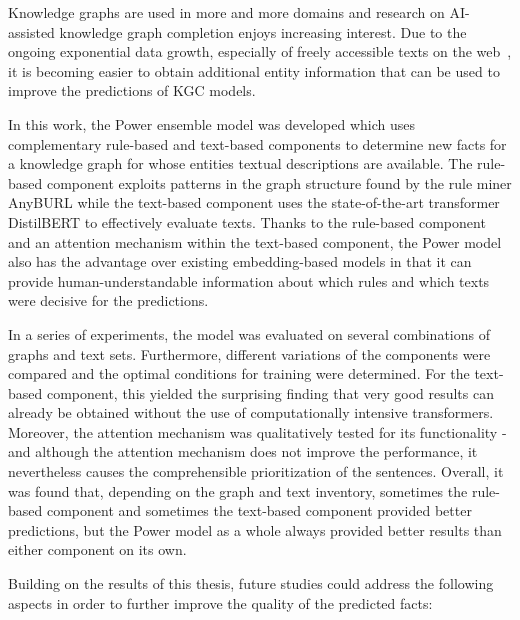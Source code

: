 Knowledge graphs are used in more and more domains and research on AI-assisted knowledge graph completion enjoys increasing interest. Due to the ongoing exponential data growth, especially of freely accessible texts on the web~\cite{Chen2014BigDA}, it is becoming easier to obtain additional entity information that can be used to improve the predictions of KGC models.

In this work, the Power ensemble model was developed which uses complementary rule-based and text-based components to determine new facts for a knowledge graph for whose entities textual descriptions are available. The rule-based component exploits patterns in the graph structure found by the rule miner AnyBURL while the text-based component uses the state-of-the-art transformer DistilBERT to effectively evaluate texts. Thanks to the rule-based component and an attention mechanism within the text-based component, the Power model also has the advantage over existing embedding-based models in that it can provide human-understandable information about which rules and which texts were decisive for the predictions.

In a series of experiments, the model was evaluated on several combinations of graphs and text sets. Furthermore, different variations of the components were compared and the optimal conditions for training were determined. For the text-based component, this yielded the surprising finding that very good results can already be obtained without the use of computationally intensive transformers. Moreover, the attention mechanism was qualitatively tested for its functionality - and although the attention mechanism does not improve the performance, it nevertheless causes the comprehensible prioritization of the sentences. Overall, it was found that, depending on the graph and text inventory, sometimes the rule-based component and sometimes the text-based component provided better predictions, but the Power model as a whole always provided better results than either component on its own.

Building on the results of this thesis, future studies could address the following aspects in order to further improve the quality of the predicted facts:


